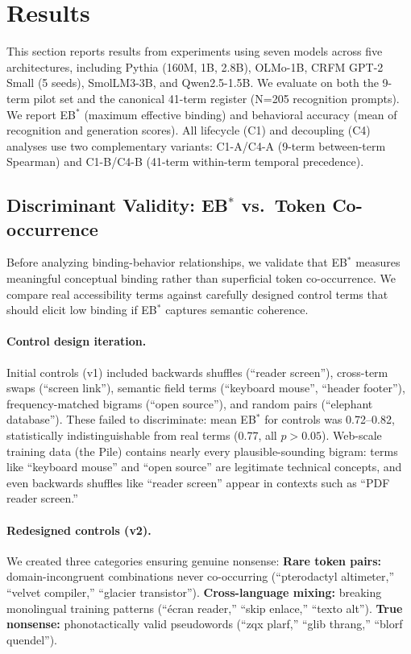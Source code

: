 \documentclass[10pt]{article} %
\begin{document}
\section{Results}

This section reports results from experiments using seven models across five architectures, including Pythia (160M, 1B, 2.8B), OLMo-1B, CRFM GPT-2 Small (5 seeds), SmolLM3-3B, and Qwen2.5-1.5B.
We evaluate on both the 9-term pilot set and the canonical 41-term register (N=205 recognition prompts).
We report EB$^*$ (maximum effective binding) and behavioral accuracy (mean of recognition and generation scores).
All lifecycle (C1) and decoupling (C4) analyses use two complementary variants: C1-A/C4-A (9-term between-term Spearman) and C1-B/C4-B (41-term within-term temporal precedence).

\subsection{Discriminant Validity: EB$^*$ vs.\ Token Co-occurrence}

Before analyzing binding-behavior relationships, we validate that EB$^*$ measures meaningful conceptual binding rather than superficial token co-occurrence.
We compare real accessibility terms against carefully designed control terms that should elicit low binding if EB$^*$ captures semantic coherence.

\paragraph{Control design iteration.}
Initial controls (v1) included backwards shuffles (``reader screen''), cross-term swaps (``screen link''), semantic field terms (``keyboard mouse'', ``header footer''), frequency-matched bigrams (``open source''), and random pairs (``elephant database'').
These failed to discriminate: mean EB$^*$ for controls was 0.72--0.82, statistically indistinguishable from real terms (0.77, all $p>0.05$).
Web-scale training data (the Pile) contains nearly every plausible-sounding bigram: terms like ``keyboard mouse'' and ``open source'' are legitimate technical concepts, and even backwards shuffles like ``reader screen'' appear in contexts such as ``PDF reader screen.''

\paragraph{Redesigned controls (v2).}
We created three categories ensuring genuine nonsense:
\textbf{Rare token pairs:} domain-incongruent combinations never co-occurring (``pterodactyl altimeter,'' ``velvet compiler,'' ``glacier transistor'').
\textbf{Cross-language mixing:} breaking monolingual training patterns (``\'ecran reader,'' ``skip enlace,'' ``texto alt'').
\textbf{True nonsense:} phonotactically valid pseudowords (``zqx plarf,'' ``glib thrang,'' ``blorf quendel'').
\end{document}
